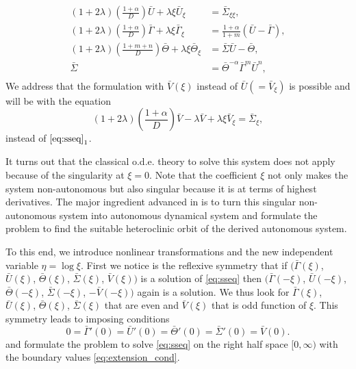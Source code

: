 \documentclass[a4paper,11pt]{article}
\def\bG{{\bar{\Gamma}}}
\def\bV{{\bar{V}}}
\def\bTh{{\bar{\Theta}}}
\def\bS{{\bar{\Sigma}}}
\def\bU{{\bar{U}}}
\theoremstyle{remark}
\begin{document}
\begin{equation}\label{eq:sseq}
\begin{aligned}
 (1+2 \lambda) \left(\frac{1 + \alpha}{D}\right) \bU + \lambda \xi \bU_\xi &= \bS_{\xi\xi},\\
 (1+2 \lambda) \left(\frac{1 + \alpha}{D}\right) \bG + \lambda \xi \bG_\xi&=\frac{1+ \alpha}{1+m}(\bU - \bG),\\
 (1+2 \lambda) \left(\frac{1 + m+n}{D}\right) \bTh + \lambda \xi \bTh_\xi&=\bS\bU - \bTh,\\
 \bS &= \bTh^ {- \alpha} \bG ^m \bU ^n,\\
\end{aligned}
\end{equation}
We address that the formulation with $\bV(\xi)$ instead of $\bU(=\bV_\xi)$ is possible and will be with the equation
$$ (1+2 \lambda) \left(\frac{1 + \alpha}{D}\right) \bV - \lambda \bV + \lambda \xi \bV_\xi=\bS_\xi,$$
instead of $\eqref{eq:sseq}_1$.

It turns out that the classical o.d.e. theory to solve this system does not apply because of the singularity at $\xi=0$. Note that the coefficient $\xi$ not only makes the system non-autonomous but also singular because it is at terms of highest derivatives. The major ingredient advanced in \cite{KOT14,KLT17} is to turn this singular non-autonomous system into autonomous dynamical system and formulate the problem to find the suitable heteroclinic orbit of the derived autonomous system.

To this end, we introduce nonlinear transformations and the new independent variable $\eta = \log\xi$. First we notice is the reflexive symmetry that if $\big(\bG(\xi)$, $\bU(\xi)$, $\bTh(\xi)$, $\bS(\xi)$, $\bV(\xi)\big)$ is a solution of \eqref{eq:sseq} then $\big(\bG(-\xi)$, $\bU(-\xi)$, $\bTh(-\xi)$, $\bS(-\xi)$, $-\bV(-\xi)\big)$ again is a solution. We thus look for $\bG(\xi)$, $\bU(\xi)$, $\bTh(\xi)$, $\bS(\xi)$ that are even and $\bV(\xi)$ that is odd function of $\xi$. This symmetry leads to imposing conditions
\begin{equation} \label{eq:extension_cond}
 0=\bG'(0)=\bU'(0)=\bTh'(0)=\bS'(0)=\bV(0).
\end{equation}
and formulate the problem to solve \eqref{eq:sseq} on the right half space $[0,\infty)$ with the boundary values \eqref{eq:extension_cond}. 
\end{document}
